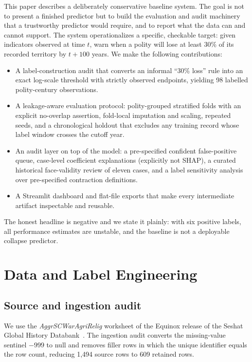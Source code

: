 \documentclass[conference]{IEEEtran}
\begin{document}
This paper describes a deliberately conservative baseline system. The goal is
not to present a finished predictor but to build the evaluation and audit
machinery that a trustworthy predictor would require, and to report what the
data can and cannot support. The system operationalizes a specific, checkable
target: given indicators observed at time $t$, warn when a polity will lose at
least 30\% of its recorded territory by $t{+}100$ years. We make the following
contributions:

\begin{itemize}
\item A label-construction audit that converts an informal ``30\% loss'' rule
into an exact log-scale threshold with strictly observed endpoints, yielding
98 labelled polity-century observations.
\item A leakage-aware evaluation protocol: polity-grouped stratified folds with
an explicit no-overlap assertion, fold-local imputation and scaling, repeated
seeds, and a chronological holdout that excludes any training record whose
label window crosses the cutoff year.
\item An audit layer on top of the model: a pre-specified confident
false-positive queue, case-level coefficient explanations (explicitly not
SHAP), a curated historical face-validity review of eleven cases, and a label
sensitivity analysis over pre-specified contraction definitions.
\item A Streamlit dashboard and flat-file exports that make every intermediate
artifact inspectable and reusable.
\end{itemize}

The honest headline is negative and we state it plainly: with six positive
labels, all performance estimates are unstable, and the baseline is not a
deployable collapse predictor.

\section{Data and Label Engineering}
\subsection{Source and ingestion audit}
We use the \emph{AggrSCWarAgriRelig} worksheet of the Equinox release of the
Seshat Global History Databank~\cite{turchin2018,seshat}. The ingestion audit
converts the missing-value sentinel $-999$ to null and removes filler rows in
which the unique identifier equals the row count, reducing 1{,}494 source rows
to 609 retained rows.
\end{document}
